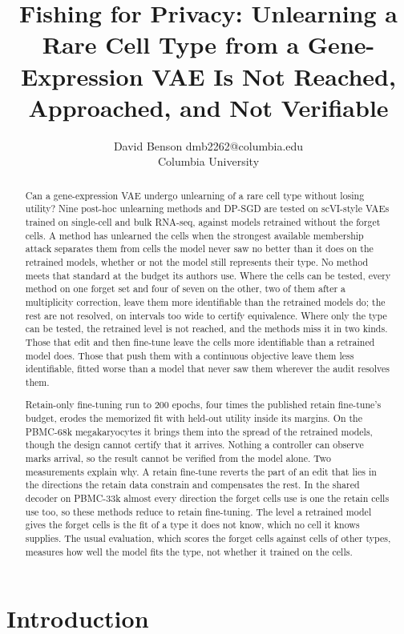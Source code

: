 \documentclass{article}
\title{Fishing for Privacy: Unlearning a Rare Cell Type from a Gene-Expression VAE Is Not Reached, Approached, and Not Verifiable}
\author{\name David Benson \email dmb2262@columbia.edu \\
        \addr Columbia University}
\begin{document}
\maketitle

\begin{abstract}
Can a gene-expression VAE undergo unlearning of a rare cell type without losing utility? Nine post-hoc unlearning methods and DP-SGD are tested on scVI-style VAEs trained on single-cell and bulk RNA-seq, against models retrained without the forget cells. A method has unlearned the cells when the strongest available membership attack separates them from cells the model never saw no better than it does on the retrained models, whether or not the model still represents their type. No method meets that standard at the budget its authors use. Where the cells can be tested, every method on one forget set and four of seven on the other, two of them after a multiplicity correction, leave them more identifiable than the retrained models do; the rest are not resolved, on intervals too wide to certify equivalence. Where only the type can be tested, the retrained level is not reached, and the methods miss it in two kinds. Those that edit and then fine-tune leave the cells more identifiable than a retrained model does. Those that push them with a continuous objective leave them less identifiable, fitted worse than a model that never saw them wherever the audit resolves them.

Retain-only fine-tuning run to 200 epochs, four times the published retain fine-tune's budget, erodes the memorized fit with held-out utility inside its margins. On the PBMC-68k megakaryocytes it brings them into the spread of the retrained models, though the design cannot certify that it arrives. Nothing a controller can observe marks arrival, so the result cannot be verified from the model alone. Two measurements explain why. A retain fine-tune reverts the part of an edit that lies in the directions the retain data constrain and compensates the rest. In the shared decoder on PBMC-33k almost every direction the forget cells use is one the retain cells use too, so these methods reduce to retain fine-tuning. The level a retrained model gives the forget cells is the fit of a type it does not know, which no cell it knows supplies. The usual evaluation, which scores the forget cells against cells of other types, measures how well the model fits the type, not whether it trained on the cells.
\end{abstract}

\section{Introduction}
\end{document}
